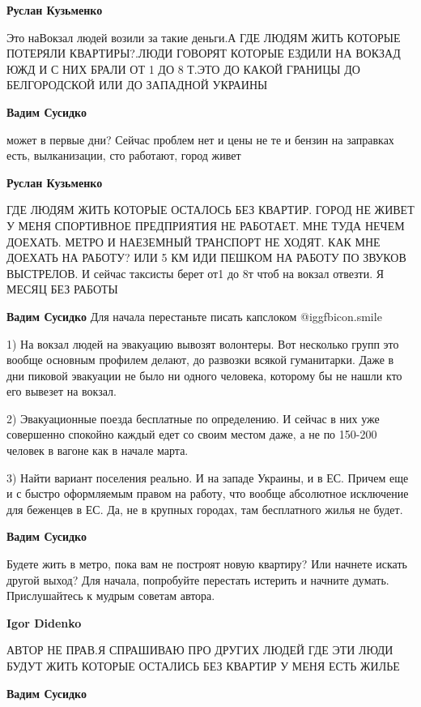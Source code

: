 \begin{itemize}
\begin{itemize}
\textbf{Руслан Кузьменко} 

Это наВокзал людей возили за такие деньги.А ГДЕ ЛЮДЯМ ЖИТЬ КОТОРЫЕ ПОТЕРЯЛИ
КВАРТИРЫ?.ЛЮДИ ГОВОРЯТ КОТОРЫЕ ЕЗДИЛИ НА ВОКЗАД ЮЖД И С НИХ БРАЛИ ОТ 1 ДО 8
Т.ЭТО ДО КАКОЙ ГРАНИЦЫ ДО БЕЛГОРОДСКОЙ ИЛИ ДО ЗАПАДНОЙ УКРАИНЫ

\textbf{Вадим Сусидко} 

может в первые дни? Сейчас проблем нет и цены не те и бензин на заправках есть,
вылканизации, сто работают, город живет

\textbf{Руслан Кузьменко} 

ГДЕ ЛЮДЯМ ЖИТЬ КОТОРЫЕ ОСТАЛОСЬ БЕЗ КВАРТИР. ГОРОД НЕ ЖИВЕТ У МЕНЯ СПОРТИВНОЕ
ПРЕДПРИЯТИЯ НЕ РАБОТАЕТ. МНЕ ТУДА НЕЧЕМ ДОЕХАТЬ. МЕТРО И НАЕЗЕМНЫЙ ТРАНСПОРТ НЕ
ХОДЯТ. КАК МНЕ ДОЕХАТЬ НА РАБОТУ? ИЛИ 5 КМ ИДИ ПЕШКОМ НА РАБОТУ ПО ЗВУКОВ
ВЫСТРЕЛОВ. И сейчас таксисты берет от1 до 8т чтоб на вокзал отвезти. Я МЕСЯЦ БЕЗ
РАБОТЫ

\textbf{Вадим Сусидко} Для начала перестаньте писать капслоком  @igg{fbicon.smile} 

1) На вокзал людей на эвакуацию вывозят волонтеры. Вот несколько групп это
вообще основным профилем делают, до развозки всякой гуманитарки. Даже в дни
пиковой эвакуации не было ни одного человека, которому бы не нашли кто его
вывезет на вокзал.

2) Эвакуационные поезда бесплатные по определению. И сейчас в них уже
совершенно спокойно каждый едет со своим местом даже, а не по 150-200 человек в
вагоне как в начале марта.

3) Найти вариант поселения реально. И на западе Украины, и в ЕС. Причем еще и с
быстро оформляемым правом на работу, что вообще абсолютное исключение для
беженцев в ЕС. Да, не в крупных городах, там бесплатного жилья не будет.

\textbf{Вадим Сусидко} 

Будете жить в метро, пока вам не построят новую квартиру? Или начнете искать
другой выход? Для начала, попробуйте перестать истерить и начните думать.
Прислушайтесь к мудрым советам автора.

\textbf{Igor Didenko} 

АВТОР НЕ ПРАВ.Я СПРАШИВАЮ ПРО ДРУГИХ ЛЮДЕЙ ГДЕ ЭТИ ЛЮДИ БУДУТ ЖИТЬ КОТОРЫЕ
ОСТАЛИСЬ БЕЗ КВАРТИР У МЕНЯ ЕСТЬ ЖИЛЬЕ

\textbf{Вадим Сусидко} 


\end{itemize}
\end{itemize}
